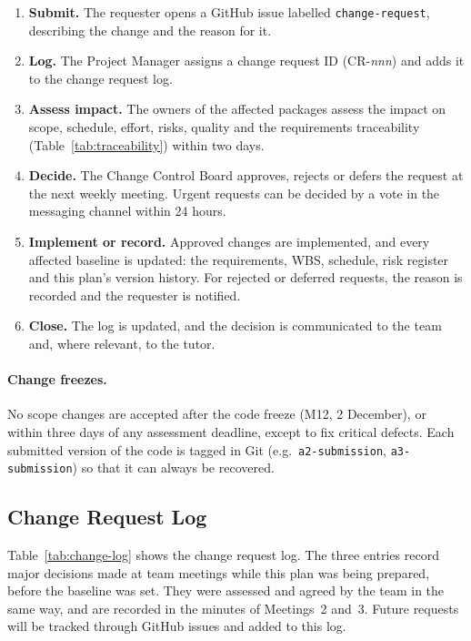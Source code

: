 \begin{enumerate}[nosep]
  \item \textbf{Submit.} The requester opens a GitHub issue labelled \texttt{change-request}, describing the change and the reason for it.
  \item \textbf{Log.} The Project Manager assigns a change request ID (CR-\textit{nnn}) and adds it to the change request log.
  \item \textbf{Assess impact.} The owners of the affected packages assess the impact on scope, schedule, effort, risks, quality and the requirements traceability (Table~\ref{tab:traceability}) within two days.
  \item \textbf{Decide.} The Change Control Board approves, rejects or defers the request at the next weekly meeting. Urgent requests can be decided by a vote in the messaging channel within 24 hours.
  \item \textbf{Implement or record.} Approved changes are implemented, and every affected baseline is updated: the requirements, WBS, schedule, risk register and this plan's version history. For rejected or deferred requests, the reason is recorded and the requester is notified.
  \item \textbf{Close.} The log is updated, and the decision is communicated to the team and, where relevant, to the tutor.
\end{enumerate}

\paragraph{Change freezes.} No scope changes are accepted after the code freeze (M12, 2 December), or within three days of any assessment deadline, except to fix critical defects. Each submitted version of the code is tagged in Git (e.g.\ \texttt{a2-submission}, \texttt{a3-submission}) so that it can always be recovered.

\subsection{Change Request Log}\label{sec:change-log}

Table~\ref{tab:change-log} shows the change request log. The three entries record major decisions made at team meetings while this plan was being prepared, before the baseline was set. They were assessed and agreed by the team in the same way, and are recorded in the minutes of Meetings~2 and~3. Future requests will be tracked through GitHub issues and added to this log.

